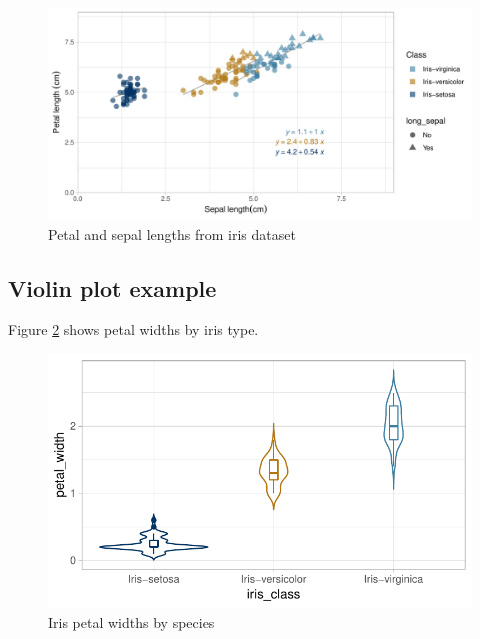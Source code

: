 \documentclass[]{elsarticle} %
\makeatletter
\def\maxwidth{\ifdim\Gin@nat@width>\linewidth\linewidth
\else\Gin@nat@width\fi}
\let\Oldincludegraphics\includegraphics
\renewcommand{\includegraphics}[1]{\Oldincludegraphics[width=\maxwidth]{#1}}
\makeatother
\begin{document}
\begin{figure}[h]

{\centering \includegraphics{Manuscript_files/figure-latex/irises-1} 

}

\caption{Petal and sepal lengths from iris dataset}\label{fig:irises}
\end{figure}

\subsection{Violin plot example}\label{violin-plot-example}

Figure \ref{fig:petalwidths} shows petal widths by iris type.

\begin{figure}[h]

{\centering \includegraphics{Manuscript_files/figure-latex/petalwidths-1} 

}

\caption{Iris petal widths by species}\label{fig:petalwidths}
\end{figure}
\end{document}
